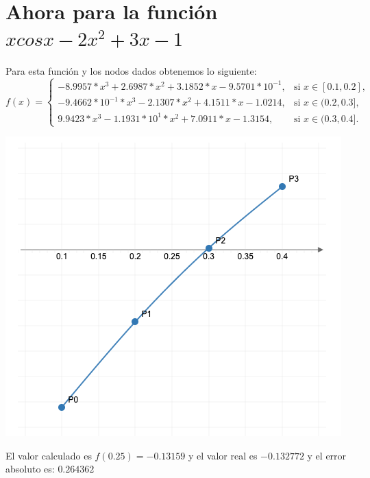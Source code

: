 \documentclass{article}
\begin{document}
\section{Ahora para la función $xcosx -2x^2 + 3x -1$}
Para esta función y los nodos dados obtenemos lo siguiente:\\
$f(x) = \begin{cases}-8.9957* x^3 + 2.6987* x^2 + 3.1852* x -9.5701 * 10^{-1}, & \text{si } x \in [0.1,0.2], \\
    -9.4662 * 10^{-1}* x^3 -2.1307* x^2 + 4.1511* x -1.0214, & \text{si } x \in (0.2,0.3], \\
    9.9423* x^3 -1.1931 * 10^{1}* x^2 + 7.0911* x -1.3154, & \text{si } x \in (0.3,0.4].\end{cases}$
\begin{center}
\includegraphics[scale=0.5]{grafica2.png}
\end{center}
El valor calculado es $f(0.25)=-0.13159$ y el valor real es $-0.132772$ y el error absoluto es: $0.264362$
\end{document}
